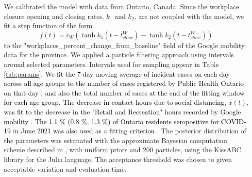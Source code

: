 \documentclass[10pt,onecolumn,twoside,lineno]{pnas-new}
\begin{document}
We calibrated the model with data from Ontario, Canada. Since the workplace closure opening and closing rates, $k_1$ and $k_2$, are not coupled with the model, we fit a step function of the form $$f(t) = \epsilon_W \left( \tanh{k_1(t - t^W_{close})} - \tanh{k_2(t - t^W_{close})}\right)$$ to the \textrm{"workplaces\_percent\_change\_from\_baseline"} field of the Google mobility data \cite{googlemobility} for the province. We applied a particle filtering approach using intervals around selected parameters. Intervals used for sampling appear in Table \ref{tab:params}. \textcolor{black}{We fit the 7-day moving average of incident cases on each day across all age groups to the number of cases registered by Public Health Ontario on that day \cite{ontariocoviddata}, and also the total number of cases at the end of the fitting window for each age group. The decrease in contact-hours due to social distancing, $x(t)$, was fit to the decrease in the "Retail and Recreation" hours recorded by Google mobility \cite{googlemobility}}.  \textcolor{black}{The 1.1 $\%$ (0.8 $\%$, 1.3 $\%$)  of Ontario residents seropositive for COVID-19 in June 2021 was also used as a fitting criterion \cite{ontario_sero}.} The posterior distribution of the parameters was estimated with the approximate Bayesian computation scheme described in \cite{turner2012approximate}, with uniform priors and 200 particles, using the KissABC \cite{kissabc} library for the Julia language. The acceptance threshold was chosen to given acceptable variation and evaluation time.

\end{document}
